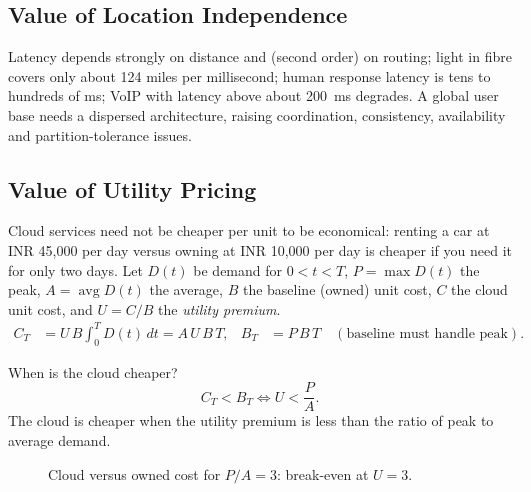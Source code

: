 \subsection{Value of Location Independence}
Latency depends strongly on distance and (second order) on routing; light in fibre covers only about 124 miles per
millisecond; human response latency is tens to hundreds of ms; VoIP with latency above about 200~ms degrades.
A global user base needs a dispersed architecture, raising coordination, consistency, availability and partition-tolerance issues.

\subsection{Value of Utility Pricing}
Cloud services need not be cheaper per unit to be economical: renting a car at INR 45,000 per day versus owning at INR 10,000 per day is
cheaper if you need it for only two days. Let $D(t)$ be demand for $0<t<T$, $P=\max D(t)$ the peak, $A=\operatorname{avg} D(t)$
the average, $B$ the baseline (owned) unit cost, $C$ the cloud unit cost, and $U = C/B$ the \emph{utility premium}.
\begin{align*}
 C_T &= U\,B\int_0^T D(t)\,dt = A\,U\,B\,T, &
 B_T &= P\,B\,T \quad(\text{baseline must handle peak}).
\end{align*}
\begin{thmbox}{When is the cloud cheaper?}
\[ C_T < B_T \iff U < \frac{P}{A}. \]
The cloud is cheaper when the utility premium is less than the ratio of peak to average demand.
\end{thmbox}

\begin{figure}[H]
\centering
{}
\caption{Cloud versus owned cost for $P/A = 3$: break-even at $U = 3$.}
\end{figure}

